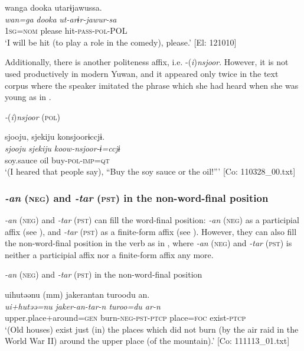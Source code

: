 \ex
{\TM}
\glll  wanga  dooka  utarɨjawussa.\\
\textit{wan=ga}  \textit{dooka}  \textit{ut-arɨr-jawur-sa}\\
1\textsc{sg}=\textsc{nom}  please  hit-\textsc{pass}-\textsc{pol}-POL\\
\glt ‘I will be hit (to play a role in the comedy), please.’ [El: 121010]
\z
\z

  Additionally, there is another politeness affix, i.e. -(\textit{i})\textit{nsjoor}. However, it is not used productively in modern Yuwan, and it appeared only twice in the text corpus where the speaker imitated the phrase which she had heard when she was young as in .

\ea\label{ex:8-144}
  \textit{-}(\textit{i})\textit{nsjoor} (\textsc{pol})

  {\TM}
\glll  {\textbar}sjooju,  sjekiju{\textbar}  konsjoorɨccjɨ.\\
\textit{sjooju}  \textit{sjekiju}  \textit{koow-nsjoor-ɨ=ccjɨ}\\
    soy.sauce  oil  buy-\textsc{pol}-\textsc{imp}=\textsc{qt}\\
\glt ‘(I heared that people say), “Buy the soy sauce or the oil!”’ [Co: 110328\_00.txt]
\z

\subsubsection{\textit{-an} (\textsc{neg}) and \textit{-tar} (\textsc{pst}) in the non-word-final position}

\textit{-an} (\textsc{neg}) and \textit{-tar} (\textsc{pst}) can fill the word-final position: \textit{-an} (\textsc{neg}) as a participial affix (see ), and \textit{-tar} (\textsc{pst}) as a finite-form affix (see ). However, they can also fill the non-word-final position in the verb as in , where \textit{-an} (\textsc{neg}) and \textit{-tar} (\textsc{pst}) is neither a participial affix nor a finite-form affix any more.

\ea\label{ex:8-145}
  \textit{-an} (\textsc{neg}) and \textit{-tar} (\textsc{pst}) in the non-word-final position

  {\TM}
\glll  uihutəənu  (mm)  {\textbar}jaker{\textbar}antan  turoodu  an.\\
\textit{ui+hutəə=nu}    \textit{jaker-an-tar-n  turoo=du  ar-n}\\
    upper.place+around=\textsc{gen}    burn-\textsc{neg}-\textsc{pst}-\textsc{ptcp}  place=\textsc{foc}  exist-\textsc{ptcp}\\
\glt ‘(Old houses) exist just (in) the places which did not burn (by the air raid in the World War II) around the upper place (of the mountain).’ [Co: 111113\_01.txt]
\z

